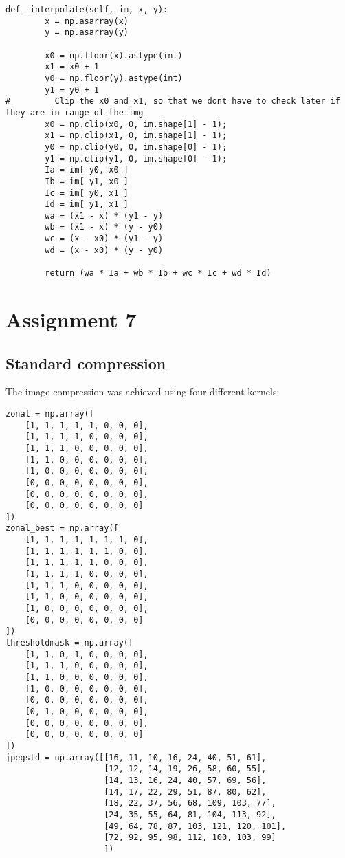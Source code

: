 \begin{verbatim}
def _interpolate(self, im, x, y):
        x = np.asarray(x)
        y = np.asarray(y)
    
        x0 = np.floor(x).astype(int)
        x1 = x0 + 1
        y0 = np.floor(y).astype(int)
        y1 = y0 + 1
#         Clip the x0 and x1, so that we dont have to check later if they are in range of the img
        x0 = np.clip(x0, 0, im.shape[1] - 1);
        x1 = np.clip(x1, 0, im.shape[1] - 1);
        y0 = np.clip(y0, 0, im.shape[0] - 1);
        y1 = np.clip(y1, 0, im.shape[0] - 1);
        Ia = im[ y0, x0 ]
        Ib = im[ y1, x0 ]
        Ic = im[ y0, x1 ]
        Id = im[ y1, x1 ]
        wa = (x1 - x) * (y1 - y)
        wb = (x1 - x) * (y - y0)
        wc = (x - x0) * (y1 - y)
        wd = (x - x0) * (y - y0)
        
        return (wa * Ia + wb * Ib + wc * Ic + wd * Id)
\end{verbatim}





\section{Assignment 7}

\subsection{Standard compression}
The image compression was achieved using four different kernels:
\begin{verbatim}
zonal = np.array([
    [1, 1, 1, 1, 1, 0, 0, 0],
    [1, 1, 1, 1, 0, 0, 0, 0],
    [1, 1, 1, 0, 0, 0, 0, 0],
    [1, 1, 0, 0, 0, 0, 0, 0],
    [1, 0, 0, 0, 0, 0, 0, 0],
    [0, 0, 0, 0, 0, 0, 0, 0],
    [0, 0, 0, 0, 0, 0, 0, 0],
    [0, 0, 0, 0, 0, 0, 0, 0]
])
zonal_best = np.array([
    [1, 1, 1, 1, 1, 1, 1, 0],
    [1, 1, 1, 1, 1, 1, 0, 0],
    [1, 1, 1, 1, 1, 0, 0, 0],
    [1, 1, 1, 1, 0, 0, 0, 0],
    [1, 1, 1, 0, 0, 0, 0, 0],
    [1, 1, 0, 0, 0, 0, 0, 0],
    [1, 0, 0, 0, 0, 0, 0, 0],
    [0, 0, 0, 0, 0, 0, 0, 0]
])
thresholdmask = np.array([
    [1, 1, 0, 1, 0, 0, 0, 0],
    [1, 1, 1, 0, 0, 0, 0, 0],
    [1, 1, 0, 0, 0, 0, 0, 0],
    [1, 0, 0, 0, 0, 0, 0, 0],
    [0, 0, 0, 0, 0, 0, 0, 0],
    [0, 1, 0, 0, 0, 0, 0, 0],
    [0, 0, 0, 0, 0, 0, 0, 0],
    [0, 0, 0, 0, 0, 0, 0, 0]
])
jpegstd = np.array([[16, 11, 10, 16, 24, 40, 51, 61],
                    [12, 12, 14, 19, 26, 58, 60, 55],
                    [14, 13, 16, 24, 40, 57, 69, 56],
                    [14, 17, 22, 29, 51, 87, 80, 62],
                    [18, 22, 37, 56, 68, 109, 103, 77],
                    [24, 35, 55, 64, 81, 104, 113, 92],
                    [49, 64, 78, 87, 103, 121, 120, 101],
                    [72, 92, 95, 98, 112, 100, 103, 99]
                    ])
\end{verbatim}

